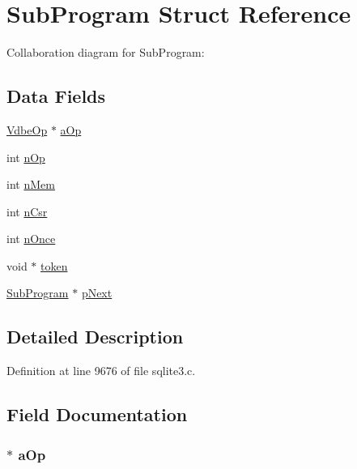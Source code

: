 \hypertarget{struct_sub_program}{}\section{Sub\+Program Struct Reference}
\label{struct_sub_program}


Collaboration diagram for Sub\+Program\+:
\subsection*{Data Fields}
\begin{DoxyCompactItemize}
\item 
\hyperlink{struct_vdbe_op}{Vdbe\+Op} $\ast$ \hyperlink{struct_sub_program_a171d0c114e02f0baf2e72c240e81fda2}{a\+Op}
\item 
int \hyperlink{struct_sub_program_a33625b7205f0da4b73ec34d2d4aefd64}{n\+Op}
\item 
int \hyperlink{struct_sub_program_a857d199d972b4d3864ce420c143508e4}{n\+Mem}
\item 
int \hyperlink{struct_sub_program_a03c8c50426636995619fc2bb1f84af56}{n\+Csr}
\item 
int \hyperlink{struct_sub_program_a8b26e5a5e9547ab221d19c9e5c56f174}{n\+Once}
\item 
void $\ast$ \hyperlink{struct_sub_program_aa80a17db18ac71350fa401959c59e642}{token}
\item 
\hyperlink{struct_sub_program}{Sub\+Program} $\ast$ \hyperlink{struct_sub_program_a0346e5d5fcebee906c306464a9e2649a}{p\+Next}
\end{DoxyCompactItemize}


\subsection{Detailed Description}


Definition at line 9676 of file sqlite3.\+c.



\subsection{Field Documentation}
\hypertarget{struct_sub_program_a171d0c114e02f0baf2e72c240e81fda2}{}
\subsubsection[{a\+Op}]{$\ast$ a\+Op}\label{struct_sub_program_a171d0c114e02f0baf2e72c240e81fda2}



